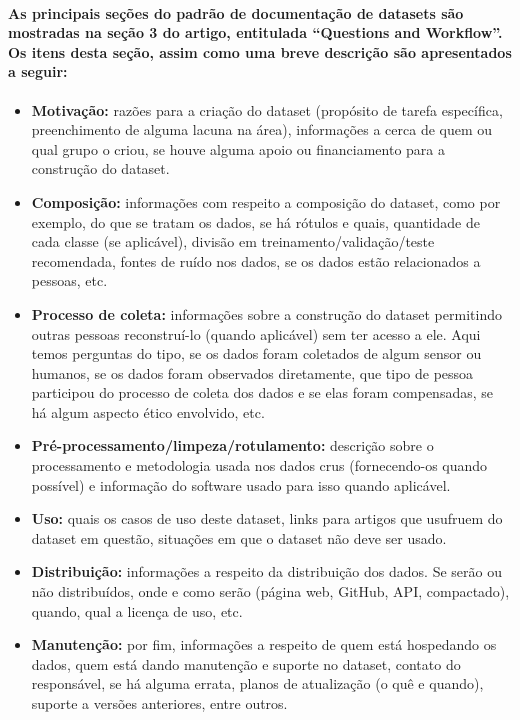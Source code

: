 \documentclass[a4paper]{article}    %
\begin{document}
\paragraph{As principais seções do padrão de documentação de datasets são mostradas na seção 3 do artigo, entitulada ``Questions and Workflow''. Os itens desta seção, assim como uma breve descrição são apresentados a seguir:}

\begin{itemize}
    \setlength\itemsep{0mm}
    \item \textbf{Motivação:} razões para a criação do dataset (propósito de tarefa específica, preenchimento de alguma lacuna na área), informações a cerca de quem ou qual grupo o criou, se houve alguma apoio ou financiamento para a construção do dataset.
    \item \textbf{Composição:} informações com respeito a composição do dataset, como por exemplo, do que se tratam os dados, se há rótulos e quais, quantidade de cada classe (se aplicável), divisão em treinamento/validação/teste recomendada, fontes de ruído nos dados, se os dados estão relacionados a pessoas, etc.
    \item \textbf{Processo de coleta:} informações sobre a construção do dataset permitindo outras pessoas reconstruí-lo (quando aplicável) sem ter acesso a ele. Aqui temos perguntas do tipo, se os dados foram coletados de algum sensor ou humanos, se os dados foram observados diretamente, que tipo de pessoa participou do processo de coleta dos dados e se elas foram compensadas, se há algum aspecto ético envolvido, etc.
    \item \textbf{Pré-processamento/limpeza/rotulamento:} descrição sobre o processamento e metodologia usada nos dados crus (fornecendo-os quando possível) e informação do software usado para isso quando aplicável.
    \item \textbf{Uso:} quais os casos de uso deste dataset, links para artigos que usufruem do dataset em questão, situações em que o dataset não deve ser usado.
    \item \textbf{Distribuição:} informações a respeito da distribuição dos dados. Se serão ou não distribuídos, onde e como serão (página web, GitHub, API, compactado), quando, qual a licença de uso, etc.
    \item \textbf{Manutenção:} por fim, informações a respeito de quem está hospedando os dados, quem está dando manutenção e suporte no dataset, contato do responsável, se há alguma errata, planos de atualização (o quê e quando), suporte a versões anteriores, entre outros.
\end{itemize}
\end{document}
